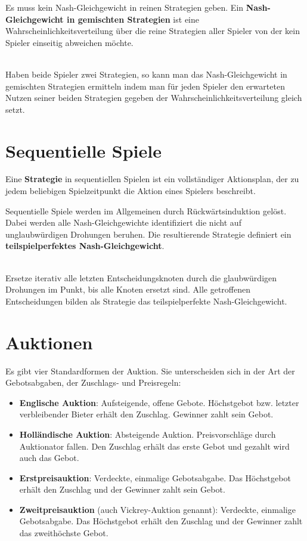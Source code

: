 Es muss kein Nash-Gleichgewicht in reinen Strategien geben. Ein \textbf{Nash-Gleichgewicht in gemischten Strategien} ist eine Wahrscheinlichkeitsverteilung über die reine Strategien aller Spieler von der kein Spieler einseitig abweichen möchte.   ~\smallskip

\begin{kr} ~\\
	Haben beide Spieler zwei Strategien, so kann man das Nash-Gleichgewicht in gemischten Strategien ermitteln indem man für jeden Spieler den erwarteten Nutzen seiner beiden Strategien gegeben der Wahrscheinlichkeitsverteilung gleich setzt.
\end{kr}

\section{Sequentielle Spiele}

Eine \textbf{Strategie} in sequentiellen Spielen ist ein vollständiger Aktionsplan, der zu jedem beliebigen Spielzeitpunkt die Aktion eines Spielers beschreibt.

Sequentielle Spiele werden im Allgemeinen durch Rückwärtsinduktion gelöst. Dabei werden alle Nash-Gleichgewichte identifiziert die nicht auf unglaubwürdigen Drohungen beruhen. Die resultierende Strategie definiert ein \textbf{teilspielperfektes Nash-Gleichgewicht}.  ~\smallskip

\begin{kr} ~\\
	Ersetze iterativ alle letzten Entscheidungsknoten durch die glaubwürdigen Drohungen im Punkt, bis alle Knoten ersetzt sind. Alle getroffenen Entscheidungen bilden als Strategie das teilspielperfekte Nash-Gleichgewicht.
\end{kr}

\section{Auktionen}

Es gibt vier Standardformen der Auktion. Sie unterscheiden sich in der Art der Gebotsabgaben, der Zuschlags- und Preisregeln:
\begin{itemize}
	\item \textbf{Englische Auktion}: Aufsteigende, offene Gebote. Höchstgebot bzw. letzter verbleibender Bieter erhält den Zuschlag. Gewinner zahlt sein Gebot.
	\item \textbf{Holländische Auktion}: Absteigende Auktion. Preisvorschläge durch Auktionator fallen. Den Zuschlag erhält das erste Gebot und gezahlt wird auch das Gebot.
	\item \textbf{Erstpreisauktion}: Verdeckte, einmalige Gebotsabgabe. Das Höchstgebot erhält den Zuschlag und der Gewinner zahlt sein Gebot.
	\item \textbf{Zweitpreisauktion} (auch Vickrey-Auktion genannt): Verdeckte, einmalige Gebotsabgabe. Das Höchstgebot erhält den Zuschlag und  der Gewinner zahlt das zweithöchste Gebot.
\end{itemize}

